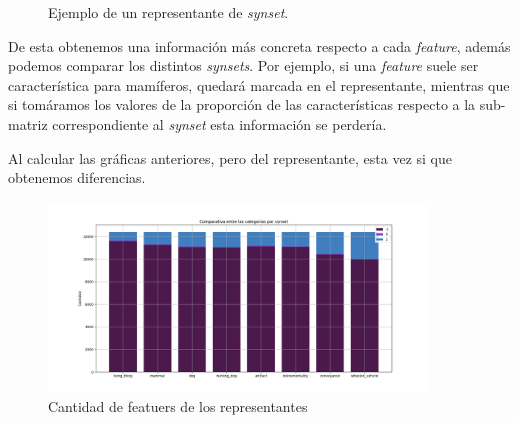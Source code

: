 \documentclass[12,twoside]{TFG-GM}
\theoremstyle{definition}
\theoremstyle{remark}
\begin{document}
\begin{figure}[H]
\begin{center}
\end{center}
\caption{Ejemplo de un representante de \textit{synset}.
\label{fig:representante}}
\end{figure}

De esta obtenemos una información más concreta respecto a cada \textit{feature}, además podemos comparar los distintos \textit{synsets}. Por ejemplo, si una \textit{feature} suele ser característica para mamíferos, quedará marcada en el representante, mientras que si tomáramos los valores de la proporción de las características respecto a la sub-matriz correspondiente al \textit{synset} esta información se perdería.

Al calcular las gráficas anteriores, pero del representante, esta vez si que obtenemos diferencias. 

\begin{figure}[ht] 
	\centering
	\includegraphics[width=0.9\textwidth] {Images/plots/25/synsetslayer/Comparative_of_synsets.png}
	\caption{ Cantidad de featuers de los representantes
	\label{fig:representantes}}
\end{figure}
\end{document}
